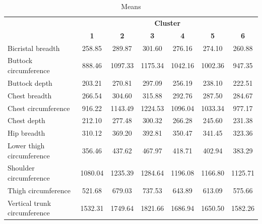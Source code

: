 \documentclass[12pt,a4paper,openany,UKenglish]{scrreprt}
\begin{document}
\begin{table}[H]
	\footnotesize
	\centering
	\caption{Means}
	\begin{tabular}{lcccccc}
		\cline{2-7}
		                             & \multicolumn{6}{c}{\textbf{Cluster}}                                                                             \\
		                             & \textbf{1}                           & \textbf{2}   & \textbf{3}   & \textbf{4}   & \textbf{5}    & \textbf{6}   \\
		\hline\hline
		Bicristal breadth            & 258.85                               & 289.87       & 301.60       & 276.16       & 274.10        & 260.88       \\
		Buttock circumference        & 888.46                               & 1097.33      & 1175.34      & 1042.16      & 1002.36       & 947.35       \\
		Buttock depth                & 203.21                               & 270.81       & 297.09       & 256.19       & 238.10        & 222.51       \\
		Chest breadth                & 266.54                               & 304.60       & 315.88       & 292.76       & 287.50        & 284.67       \\
		Chest circumference          & 916.22                               & 1143.49      & 1224.53      & 1096.04      & 1033.34       & 977.17       \\
		Chest depth                  & 212.10                               & 277.48       & 300.32       & 266.28       & 245.60        & 231.38       \\
		Hip breadth                  & 310.12                               & 369.20       & 392.81       & 350.47       & 341.45        & 323.36       \\
		Lower thigh circumference    & 356.46                               & 437.62       & 467.97       & 418.71       & 402.94        & 383.29       \\
		Shoulder circumference       & 1080.04                              & 1235.39      & 1284.64      & 1196.08      & 1166.80       & 1125.71      \\
		Thigh circumference          & 521.68                               & 679.03       & 737.53       & 643.89       & 613.09        & 575.66       \\
		Vertical trunk circumference & 1532.31                              & 1749.64      & 1821.66      & 1686.94      & 1650.50       & 1582.26      \\

\end{tabular}
\end{table}
\end{document}
